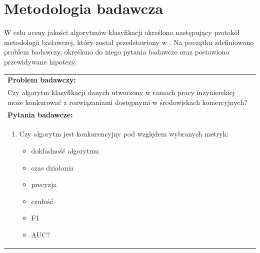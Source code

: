 \section{Metodologia badawcza}
\label{sec:met}
W celu oceny jakości algorytmów klasyfikacji określono następujący protokół metodologii badawczej, który został przedstawiony w . Na początku zdefiniowano problem badawczy, określono do niego pytania badawcze oraz postawiono przewidywane hipotezy.
\vfill
\pagebreak
\begin{table}[H]
    \centering
    \begin{tabular}{|L{\textwidth}|}
        \hline
        \textbf{Problem badawczy:}                                                                                                                     \\
        Czy algorytm klasyfikacji danych utworzony w ramach pracy inżynierskiej może konkurować z rozwiązaniami dostępnymi w środowiskach komercyjnych? \\ \hline

        \textbf{Pytania badawcze:}                                                                                                                     \\
        \begin{enumerate}
            \item Czy algorytm jest konkurencyjny pod względem wybranych metryk:
            \begin{itemize}
                \item dokładność algorytmu
                \item czas działania
                \item precyzja
                \item czułość
                \item F1
                \item AUC?
            \end{itemize}
        \end{enumerate}                                                                                                                                \\ \hline


\end{tabular}
\end{table}
